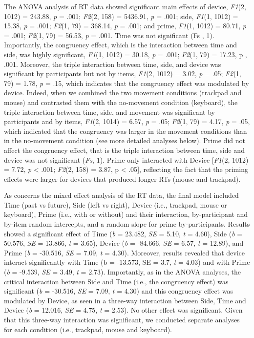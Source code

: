 \documentclass[
  a4paper,12pt,twoside,onecolumn,openright,final,oldfontcommands]{memoir}
\begin{document}
The ANOVA analysis of RT data showed significant main effects of device, \emph{F1}(2, 1012) = 243.88, \emph{p} = .001; \emph{F2}(2, 158) = 5436.91, \emph{p} = .001; side, \emph{F1}(1, 1012) = 15.38, \emph{p} = .001; \emph{F2}(1, 79) = 368.14, \emph{p} = .001; and prime, \emph{F1}(1, 1012) = 80.71, \emph{p} = .001; \emph{F2}(1, 79) = 56.53, \emph{p} = .001. Time was not significant (Fs , 1). Importantly, the congruency effect, which is the interaction between time and side, was highly significant, \emph{F1}(1, 1012) = 30.18, \emph{p} = .001; \emph{F2}(1, 79) = 17.23, p , .001. Moreover, the triple interaction between time, side, and device was significant by participants but not by items, \emph{F1}(2, 1012) = 3.02, \emph{p} = .05; \emph{F2}(1, 79) = 1.78, \emph{p} = .15, which indicates that the congruency effect was modulated by device. Indeed, when we combined the two movement conditions (trackpad and mouse) and contrasted them with the no-movement condition (keyboard), the triple interaction between time, side, and movement was significant by participants and by items, \emph{F1}(2, 1014) = 6.57, \emph{p} = .05; \emph{F2}(1, 79) = 4.17, \emph{p} = .05, which indicated that the congruency was larger in the movement conditions than in the no-movement condition (see more detailed analyses below). Prime did not affect the congruency effect, that is the triple interaction between time, side and device was not significant (\emph{Fs}, 1). Prime only interacted with Device {[}\emph{F1}(2, 1012) = 7.72, \emph{p} \textless{} .001; \emph{F2}(2, 158) = 3.87, p \textless{} .05{]}, reflecting the fact that the priming effects were larger for devices that produced longer RTs (mouse and trackpad).

As concerns the mixed effect analysis of the RT data, the final model included Time (past vs future), Side (left vs right), Device (i.e., trackpad, mouse or keyboard), Prime (i.e., with or without) and their interaction, by-participant and by-item random intercepts, and a random slope for prime by-participants. Results showed a significant effect of Time (\emph{b} = 23.482, \emph{SE} = 5.10, \emph{t} = 4.60), Side (\emph{b} = 50.576, \emph{SE} = 13.866, \emph{t} = 3.65), Device (\emph{b} = -84.666, \emph{SE} = 6.57, \emph{t} = 12.89), and Prime (\emph{b} = -30.516, \emph{SE} = 7.09, \emph{t} = 4.30). Moreover, results revealed that device interact significantly with Time (b = -13.573, SE = 3.7, \emph{t} = 4.03) and with Prime (\emph{b} = -9.539, \emph{SE} = 3.49, \emph{t} = 2.73). Importantly, as in the ANOVA analyses, the critical interaction between Side and Time (i.e., the congruency effect) was significant (\emph{b} = -30.516, \emph{SE} = 7.09, \emph{t} = 4.30) and this congruency effect was modulated by Device, as seen in a three-way interaction between Side, Time and Device (\emph{b} = 12.016, \emph{SE} = 4.75, \emph{t} = 2.53). No other effect was significant. Given that this three-way interaction was significant, we conducted separate analyses for each condition (i.e., trackpad, mouse and keyboard).
\end{document}
